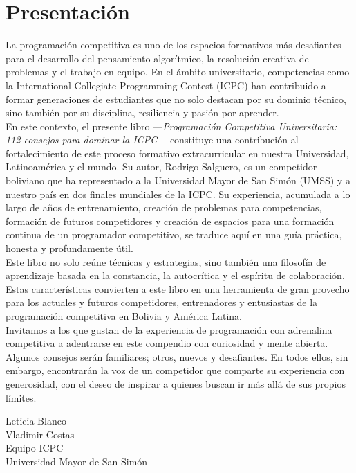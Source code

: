 \clearpage
\section*{Presentación}
La programación competitiva es uno de los espacios formativos más desafiantes para el desarrollo del pensamiento algorítmico, la resolución creativa de problemas y el trabajo en equipo. En el ámbito universitario, competencias como la International Collegiate Programming Contest (ICPC) han contribuido a formar generaciones de estudiantes que no solo destacan por su dominio técnico, sino también por su disciplina, resiliencia y pasión por aprender.\\

En este contexto, el presente libro —\textit{Programación Competitiva Universitaria: 112 consejos para dominar la ICPC}— constituye una contribución al fortalecimiento de este proceso formativo extracurricular en nuestra Universidad, Latinoamérica y el mundo. Su autor, Rodrigo Salguero, es un competidor boliviano que ha representado a la Universidad Mayor de San Simón (UMSS) y a nuestro país en dos finales mundiales de la ICPC. Su experiencia, acumulada a lo largo de años de entrenamiento, creación de problemas para competencias, formación de futuros competidores y creación de espacios para una formación continua de un programador competitivo, se traduce aquí en una guía práctica, honesta y profundamente útil.\\

Este libro no solo reúne técnicas y estrategias, sino también una filosofía de aprendizaje basada en la constancia, la autocrítica y el espíritu de colaboración. Estas características convierten a este libro en una herramienta de gran provecho para los actuales y futuros competidores, entrenadores y entusiastas de la programación competitiva en Bolivia y América Latina.\\

Invitamos a los que gustan de la experiencia de programación con adrenalina competitiva a adentrarse en este compendio con curiosidad y mente abierta. Algunos consejos serán familiares; otros, nuevos y desafiantes. En todos ellos, sin embargo, encontrarán la voz de un competidor que comparte su experiencia con generosidad, con el deseo de inspirar a quienes buscan ir más allá de sus propios límites.
\vspace{0.5cm} %

\begin{flushright}
Leticia Blanco\\
Vladimir Costas\\
Equipo ICPC\\
Universidad Mayor de San Simón
\end{flushright}

